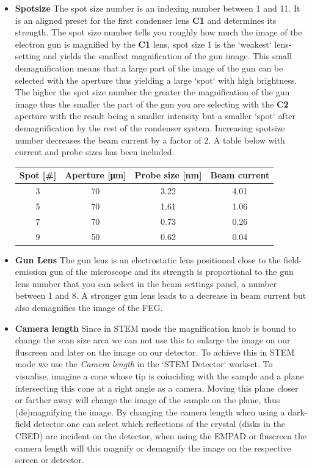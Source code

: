 \documentclass[a4paper]{scrartcl}
\begin{document}
\begin{itemize}
	      \item{\textbf{Spotsize}}
	      The spot size number is an indexing number between 1 and 11. It is an aligned preset for the first condenser lens \textbf{C1} and determines its strength. The spot size number tells you roughly how much the image of the electron gun is magnified by the \textbf{C1} lens, spot size 1 is the `weakest` lens-setting and yields the smallest magnification of the gun image. This small demagnification means that a large part of the image of the gun can be selected with the aperture thus yielding a large `spot` with high brightness. The higher the spot size number the greater the magnification of the gun image thus the smaller the part of the gun you are selecting with the \textbf{C2} aperture with the result being a smaller intensity but a smaller `spot` after demagnification by the rest of the condenser system. Increasing spotsize number decreases the beam current by a factor of 2. A table below with current and probe sizes has been included.

	      \begin{table}[h!]
		      \centering
		      \begin{tabular}{c|c|c|c}
			      Spot [\#] & Aperture [μm] & Probe size [nm] & Beam current \\ \hline
			      3         & 70            & 3.22            & 4.01         \\
			      5         & 70            & 1.61            & 1.06         \\
			      7         & 70            & 0.73            & 0.26         \\
			      9         & 50            & 0.62            & 0.04
		      \end{tabular}
	      \end{table}

	\item \textbf{Gun Lens}
	      The gun lens is an electrostatic lens positioned close to the field-emission gun of the microscope and its strength is proportional to the gun lens number that you can select in the beam settings panel, a number between 1 and 8. A stronger gun lens leads to a decrease in beam current but also demagnifies the image of the FEG.

	      \item{\textbf{Camera length}
	                  Since in STEM mode the magnification knob is bound to change the scan size area we can not use this to enlarge the image on our fluscreen and later on the image on our detector. To achieve this in STEM mode we use the \textit{Camera length} in the `STEM Detector` workset. To visualise, imagine a cone whose tip is coinciding with the sample and a plane intersecting this cone at a right angle as a camera. Moving this plane closer or farther away will change the image of the sample on the plane, thus (de)magnifying the image. By changing the camera length when using a dark-field detector one can select which reflections of the crystal (disks in the CBED) are incident on the detector, when using the EMPAD or fluscreen the camera length will this magnify or demagnify the image on the respective screen or detector.}
\end{itemize}
\end{document}
